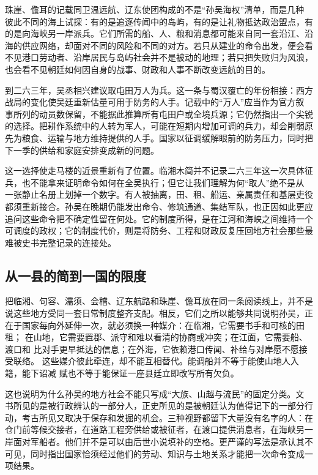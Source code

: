 珠崖、儋耳的记载同卫温远航、辽东使团构成的不是“孙吴海权”清单，而是几种
彼此不同的海上试探：有的是追逐传闻中的岛屿，有的是让礼物抵达政治盟点，有
的是向海峡另一岸派兵。它们所需的船、人、粮和消息都可能来自同一套沿江、沿
海的供应网络，却面对不同的风险和不同的对方。若只从建业的命令出发，便会看
不见港口劳动者、沿岸居民与岛屿社会并不是被动的地理；若只把失败归为风浪，
也会看不见朝廷如何因自身的战事、财政和人事不断改变远航的目的。

到二六三年，吴丞相兴建议取屯田万人为兵。这一条与蜀汉覆亡的年份相接：西方
战局的变化使吴廷重新估量可用于防务的人手。记载中的“万人”应当作为官方叙
事所列的动员数保留，不能据此推算所有屯田户或全境兵源；它仍然指出一个尖锐
的选择。把耕作系统中的人转为军人，可能在短期内增加可调的兵力，却会削弱原
先为粮食、运输与地方维持提供的人手。国家以征调缓解眼前的防务压力，同时把
下一季的供给和家庭安排变成新的问题。

这一选择使走马楼的近景重新有了位置。临湘木简并不记录二六三年这一次具体征
兵，也不能拿来证明命令如何在全吴执行；但它让我们理解为何“取人”绝不是从
一张静止名册上划掉一个数字。有人被抽离，田、租、船运、亲属责任和基层吏役
都须重新接合。孙吴在晚期仍能发出命令、修筑通道、集结军队，也正因如此更应
追问这些命令把不确定性留在何处。它的制度所得，是在江河和海峡之间维持一个
可调度的政权；它的制度代价，则是将防务、工程和财政反复压回地方社会那些最
难被史书完整记录的连接处。

\subsection{从一县的简到一国的限度}

把临湘、句容、濡须、会稽、辽东航路和珠崖、儋耳放在同一条阅读线上，并不是
说这些地方受同一套日常制度整齐支配。相反，它们之所以能够共同说明孙吴，正
在于国家每向外延伸一次，就必须换一种媒介：在临湘，它需要书手和可核的田租；
在山地，它需要置郡、派守和难以看清的协商或冲突；在江面，它需要船、渡口和
比对手更早抵达的信息；在外海，它依赖港口传闻、补给与对岸愿不愿接受联络。
这些媒介彼此牵连，却不能互相替代。能调船并不等于能使山地人入籍，能下诏减
赋也不等于能保证一座县廷立即改写所有欠负。

这也说明为什么孙吴的地方社会不能只写成“大族、山越与流民”的固定分类。文
书所见的是被行政辨认的一部分人，正史所见的是被朝廷认为值得记下的一部分行
动，考古所见又取决于保存和发掘的机会。三种视野都留下大量没有名字的人：在
仓门前等候交接者，在道路工程旁供给或被征者，在渡口提供消息者，在海峡另一
岸面对军船者。他们并不是可以由后世小说填补的空格。更严谨的写法是承认其不
可见，同时指出国家恰须经过他们的劳动、知识与土地关系才能把一次命令变成一
项结果。


